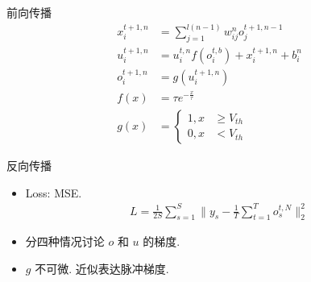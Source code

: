 \documentclass{beamer}
\begin{document}
\begin{frame}{前向传播}
    \begin{equation*}
        \begin{aligned}
            x_i^{t+1,n} &= \sum_{j=1}^{l(n-1)}w_{ij}^no_j^{t+1,n-1} \\
            u_i^{t+1,n} &= u_i^{t,n}f(o_i^{t,b})+x_i^{t+1,n}+b_i^n \\
            o_i^{t+1,n} &= g(u_i^{t+1,n}) \\
            f(x) &= \tau e^{-\frac{x}{\tau}} \\
            g(x) &= \left\{
                \begin{aligned}
                    1, x &\geq V_{th} \\
                    0, x &< V_{th}
                \end{aligned}
            \right.
        \end{aligned}
    \end{equation*}
\end{frame}

\begin{frame}{反向传播}
    \begin{itemize}
        \item Loss: MSE.
            \begin{equation*}
                \begin{aligned}
                    L=\frac{1}{2S}\sum_{s=1}^S\|y_s-\frac{1}{T}\sum_{t=1}^To_s^{t,N}\|_2^2
                \end{aligned}
            \end{equation*}
        \item 分四种情况讨论 $o$ 和 $u$ 的梯度.
        \item $g$ 不可微. 近似表达脉冲梯度.
    \end{itemize}
\end{frame}

\end{document}
